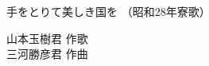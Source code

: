 \documentclass[10pt,b5j]{tarticle} %
\begin{document}
\begin{minipage}[c]{0.7\hsize} %
    \begin{center}
        {\LARGE
            手をとりて美しき国を %
        }
        {\small 
            （昭和28年寮歌） %
        }
    \end{center}
\end{minipage}
\begin{minipage}[c]{0.3\hsize} %
    \begin{flushright} %
        山本玉樹君 作歌\\三河勝彦君 作曲 %
    \end{flushright}
\end{minipage}
\end{document}
